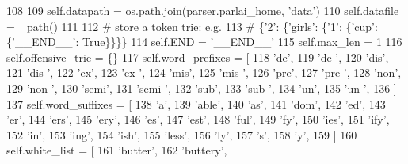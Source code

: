 \begin{DoxyCode}
108 
109         self.datapath = os.path.join(parser.parlai\_home, \textcolor{stringliteral}{'data'})
110         self.datafile = \_path()
111 
112         \textcolor{comment}{# store a token trie: e.g.}
113         \textcolor{comment}{# \{'2': \{'girls': \{'1': \{'cup': \{'\_\_END\_\_': True\}\}\}\}}
114         self.END = \textcolor{stringliteral}{'\_\_END\_\_'}
115         self.max\_len = 1
116         self.offensive\_trie = \{\}
117         self.word\_prefixes = [
118             \textcolor{stringliteral}{'de'},
119             \textcolor{stringliteral}{'de-'},
120             \textcolor{stringliteral}{'dis'},
121             \textcolor{stringliteral}{'dis-'},
122             \textcolor{stringliteral}{'ex'},
123             \textcolor{stringliteral}{'ex-'},
124             \textcolor{stringliteral}{'mis'},
125             \textcolor{stringliteral}{'mis-'},
126             \textcolor{stringliteral}{'pre'},
127             \textcolor{stringliteral}{'pre-'},
128             \textcolor{stringliteral}{'non'},
129             \textcolor{stringliteral}{'non-'},
130             \textcolor{stringliteral}{'semi'},
131             \textcolor{stringliteral}{'semi-'},
132             \textcolor{stringliteral}{'sub'},
133             \textcolor{stringliteral}{'sub-'},
134             \textcolor{stringliteral}{'un'},
135             \textcolor{stringliteral}{'un-'},
136         ]
137         self.word\_suffixes = [
138             \textcolor{stringliteral}{'a'},
139             \textcolor{stringliteral}{'able'},
140             \textcolor{stringliteral}{'as'},
141             \textcolor{stringliteral}{'dom'},
142             \textcolor{stringliteral}{'ed'},
143             \textcolor{stringliteral}{'er'},
144             \textcolor{stringliteral}{'ers'},
145             \textcolor{stringliteral}{'ery'},
146             \textcolor{stringliteral}{'es'},
147             \textcolor{stringliteral}{'est'},
148             \textcolor{stringliteral}{'ful'},
149             \textcolor{stringliteral}{'fy'},
150             \textcolor{stringliteral}{'ies'},
151             \textcolor{stringliteral}{'ify'},
152             \textcolor{stringliteral}{'in'},
153             \textcolor{stringliteral}{'ing'},
154             \textcolor{stringliteral}{'ish'},
155             \textcolor{stringliteral}{'less'},
156             \textcolor{stringliteral}{'ly'},
157             \textcolor{stringliteral}{'s'},
158             \textcolor{stringliteral}{'y'},
159         ]
160         self.white\_list = [
161             \textcolor{stringliteral}{'butter'},
162             \textcolor{stringliteral}{'buttery'},

\end{DoxyCode}
